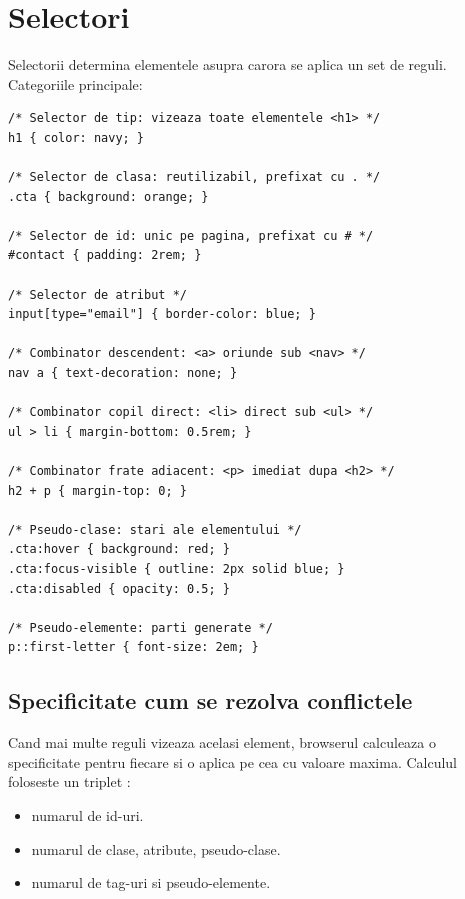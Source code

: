 \section{Selectori}

Selectorii determina elementele asupra carora se aplica un set de reguli. Categoriile principale:

\begin{lstlisting}[style=css, caption={Selectori uzuali}]
/* Selector de tip: vizeaza toate elementele <h1> */
h1 { color: navy; }

/* Selector de clasa: reutilizabil, prefixat cu . */
.cta { background: orange; }

/* Selector de id: unic pe pagina, prefixat cu # */
#contact { padding: 2rem; }

/* Selector de atribut */
input[type="email"] { border-color: blue; }

/* Combinator descendent: <a> oriunde sub <nav> */
nav a { text-decoration: none; }

/* Combinator copil direct: <li> direct sub <ul> */
ul > li { margin-bottom: 0.5rem; }

/* Combinator frate adiacent: <p> imediat dupa <h2> */
h2 + p { margin-top: 0; }

/* Pseudo-clase: stari ale elementului */
.cta:hover { background: red; }
.cta:focus-visible { outline: 2px solid blue; }
.cta:disabled { opacity: 0.5; }

/* Pseudo-elemente: parti generate */
p::first-letter { font-size: 2em; }
\end{lstlisting}

\subsection{Specificitate \textendash{} cum se rezolva conflictele}

Cand mai multe reguli vizeaza acelasi element, browserul calculeaza o specificitate pentru fiecare si o aplica pe cea cu valoare maxima. Calculul foloseste un triplet :

\begin{itemize}[itemsep=1pt]
  \item {} \textendash{} numarul de id-uri.
  \item {} \textendash{} numarul de clase, atribute, pseudo-clase.
  \item {} \textendash{} numarul de tag-uri si pseudo-elemente.
\end{itemize}

